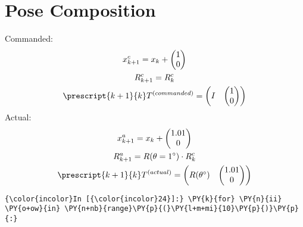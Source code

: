 \documentclass[a4paper]{scrreprt}
\begin{document}
\section{Pose Composition}\label{pose-composition}
Commanded:
\begin{gather}
x^c_{k+1} = x_k + \begin{pmatrix} 1 \\ 0 \end{pmatrix} \\
R^c_{k+1} = R^c_k \\
\prescript{k+1}{k}T^{(commanded)} = \begin{pmatrix}
I & \begin{pmatrix}
1 \\ 0
\end{pmatrix} 
\end{pmatrix}
\end{gather}
Actual:
\begin{gather}
	x^a_{k+1} = x_k + \begin{pmatrix} 1.01 \\ 0 \end{pmatrix} \\
	R^a_{k+1} = R(\theta = 1^{\circ}) \cdot R^c_k \\
	\prescript{k+1}{k}T^{(actual)} = \begin{pmatrix}
	R(\theta^{\circ}) & \begin{pmatrix}
	1.01 \\ 0
	\end{pmatrix} 
	\end{pmatrix}
\end{gather}

\begin{Verbatim}[commandchars=\\\{\}]
{\color{incolor}In [{\color{incolor}24}]:} \PY{k}{for} \PY{n}{ii} \PY{o+ow}{in} \PY{n+nb}{range}\PY{p}{(}\PY{l+m+mi}{10}\PY{p}{)}\PY{p}{:} 

\end{Verbatim}


%


\end{document}
